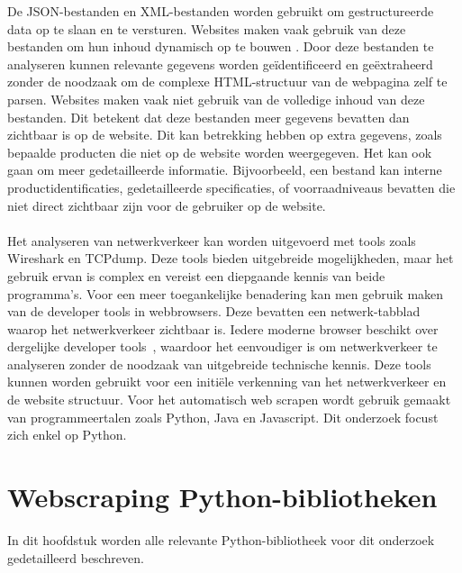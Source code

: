 De JSON-bestanden en XML-bestanden worden gebruikt om gestructureerde data op te slaan en te versturen. Websites maken vaak gebruik van deze bestanden om hun inhoud dynamisch op te bouwen \autocite{DeGroote2022}. Door deze bestanden te analyseren kunnen relevante gegevens worden geïdentificeerd en geëxtraheerd zonder de noodzaak om de complexe HTML-structuur van de webpagina zelf te parsen. Websites maken vaak niet gebruik van de volledige inhoud van deze bestanden. Dit betekent dat deze bestanden meer gegevens bevatten dan zichtbaar is op de website. Dit kan betrekking hebben op extra gegevens, zoals bepaalde producten die niet op de website worden weergegeven. Het kan ook gaan om meer gedetailleerde informatie. Bijvoorbeeld, een bestand kan interne productidentificaties, gedetailleerde specificaties, of voorraadniveaus bevatten die niet direct zichtbaar zijn voor de gebruiker op de website.
\\
\\
Het analyseren van netwerkverkeer kan worden uitgevoerd met tools zoals Wireshark en TCPdump. Deze tools bieden uitgebreide mogelijkheden, maar het gebruik ervan is complex en vereist een diepgaande kennis van beide programma's. Voor een meer toegankelijke benadering kan men gebruik maken van de developer tools in webbrowsers. Deze bevatten een netwerk-tabblad waarop het netwerkverkeer zichtbaar is. Iedere moderne browser beschikt over dergelijke developer tools~\autocite{mdn2023}, waardoor het eenvoudiger is om netwerkverkeer te analyseren zonder de noodzaak van uitgebreide technische kennis. Deze tools kunnen worden gebruikt voor een initiële verkenning van het netwerkverkeer en de website structuur. Voor het automatisch web scrapen wordt gebruik gemaakt van programmeertalen zoals Python, Java en Javascript. Dit onderzoek focust zich enkel op Python.

\section{Webscraping Python-bibliotheken}
In dit hoofdstuk worden alle relevante Python-bibliotheek voor dit onderzoek gedetailleerd beschreven.

